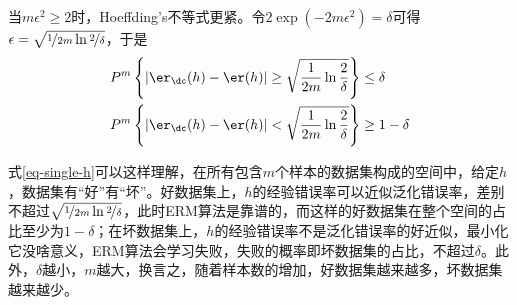 \documentclass{ctexart}
\begin{document}
当$m \epsilon^2 \ge 2$时，Hoeffding's不等式更紧。令$2 \exp(-2 m \epsilon^2) = \delta$可得$\epsilon = \sqrt{\nicefrac{1}{2m} \ln \nicefrac{2}{\delta}}$，于是
\begin{align} \label{eq-single-h}
    \begin{split}
        P^m \left\{ |\er_\dc (h) - \er (h)| \ge \sqrt{\frac{1}{2m} \ln \frac{2}{\delta}} \right\} & \le \delta     \\
        P^m \left\{ |\er_\dc (h) - \er (h)| < \sqrt{\frac{1}{2m} \ln \frac{2}{\delta}} \right\}   & \ge 1 - \delta
    \end{split}
\end{align}

\begin{remark}
    式\eqref{eq-single-h}可以这样理解，在所有包含$m$个样本的数据集构成的空间中，给定$h$，数据集有“好”有“坏”。好数据集上，$h$的经验错误率可以近似泛化错误率，差别不超过$\sqrt{\nicefrac{1}{2m} \ln \nicefrac{2}{\delta}}$，此时ERM算法是靠谱的，而这样的好数据集在整个空间的占比至少为$1- \delta$；在坏数据集上，$h$的经验错误率不是泛化错误率的好近似，最小化它没啥意义，ERM算法会学习失败，失败的概率即坏数据集的占比，不超过$\delta$。此外，$\delta$越小，$m$越大，换言之，随着样本数的增加，好数据集越来越多，坏数据集越来越少。
\end{remark}
\end{document}
